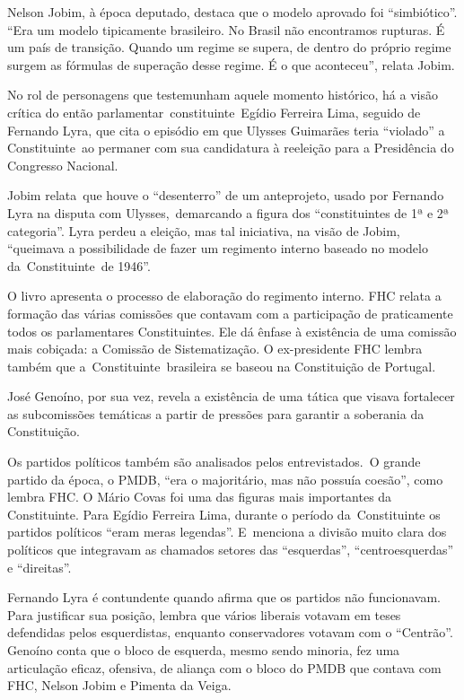 Nelson Jobim, à época deputado, destaca que o modelo aprovado foi
``simbiótico''. ``Era um modelo tipicamente brasileiro. No Brasil não
encontramos rupturas. É um país de transição. Quando um regime se
supera, de dentro do próprio regime surgem as fórmulas de superação
desse regime. É o que aconteceu'', relata Jobim.

No rol de personagens que testemunham aquele momento histórico, há a
visão crítica do então parlamentar~constituinte~Egídio Ferreira Lima,
seguido de Fernando Lyra, que cita o episódio em que Ulysses Guimarães
teria ``violado'' a Constituinte~ao permaner com sua candidatura à
reeleição para a Presidência do Congresso Nacional.

Jobim relata~que houve o ``desenterro'' de um anteprojeto, usado por
Fernando Lyra na disputa com Ulysses,~demarcando a figura dos
``constituintes de 1ª e 2ª categoria''. Lyra perdeu a eleição, mas tal
iniciativa, na visão de Jobim, ``queimava a possibilidade de fazer um
regimento interno baseado no modelo da~Constituinte~de 1946''.

O livro apresenta o processo de elaboração do regimento interno. FHC
relata a formação das várias comissões que contavam com a participação
de praticamente todos os parlamentares Constituintes. Ele dá ênfase à
existência de uma comissão mais cobiçada: a Comissão de Sistematização.
O ex-presidente FHC lembra também que a~Constituinte~brasileira se
baseou na Constituição de Portugal.

José Genoíno, por sua vez, revela a existência de uma tática que visava
fortalecer as subcomissões temáticas a partir de pressões para garantir
a soberania da Constituição.

Os partidos políticos também são analisados pelos entrevistados.~O
grande partido da época, o PMDB, ``era o majoritário, mas não possuía
coesão'', como lembra FHC. O Mário Covas foi uma das figuras mais
importantes da Constituinte. Para Egídio Ferreira Lima, durante o
período da~Constituinte os partidos políticos ``eram meras legendas''.
E~menciona a divisão muito clara dos políticos que integravam as
chamados setores das ``esquerdas'', ``centroesquerdas'' e ``direitas''.~

Fernando Lyra é contundente quando afirma que os partidos não
funcionavam. Para justificar sua posição, lembra que vários liberais
votavam em teses defendidas pelos esquerdistas, enquanto conservadores
votavam com o ``Centrão''. Genoíno conta que o bloco de esquerda, mesmo
sendo minoria, fez uma articulação eficaz, ofensiva, de aliança com o
bloco do PMDB que contava com FHC, Nelson Jobim e Pimenta da Veiga.

